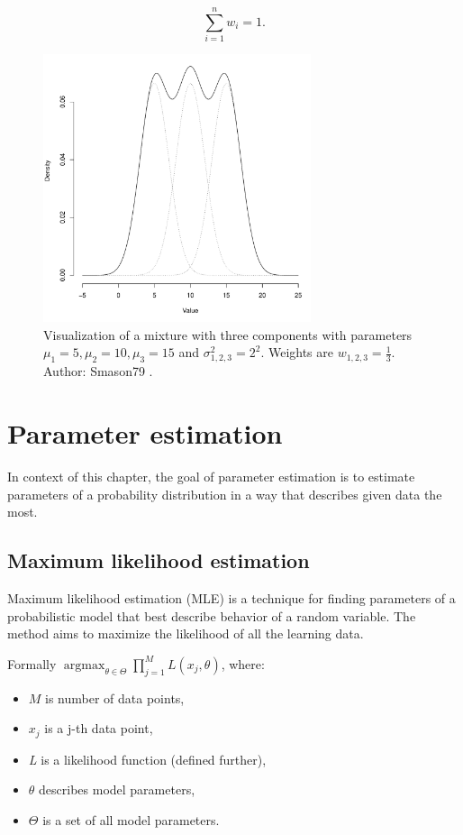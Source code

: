 \documentclass[thesis=B,english]{FITthesis}[2012/06/26]
\DeclareMathOperator*{\argmax}{argmax} %
\begin{document}
\begin{equation}
\sum_{i=1}^n w_i = 1.
\end{equation}

\begin{figure}
	\centering
 	\includegraphics[width=0.7\textwidth]{gaussian_mixture}
 	\caption{Visualization of a mixture with three components with parameters $\mu_1=5, \mu_2=10, \mu_3=15$ and $\sigma_{1,2,3}^2=2^2$. Weights are $w_{1,2,3} = \frac{1}{3}$. Author: Smason79 \cite{gaussian-mixture}.}
 	\label{fig:gaussian_mixture}
\end{figure}

\chapter{Parameter estimation}
\label{parameter-estimation-chapter}
In context of this chapter, the goal of parameter estimation is to estimate parameters of a probability distribution in a way that describes given data the most.

\section{Maximum likelihood estimation}
Maximum likelihood estimation (MLE) is a technique for finding parameters of a probabilistic model that best describe behavior of a random variable. The method aims to maximize the likelihood of all the learning data.

Formally $\argmax_{\theta \in \Theta} \prod_{j=1}^{M} L(x_j, \theta)$, where:

\begin{itemize}

\item $M$ is number of data points,
\item $x_j$ is a j-th data point,
\item \emph{L} is a likelihood function (defined further),
\item $\theta$ describes model parameters,
\item $\Theta$ is a set of all model parameters.

\end{itemize}
\end{document}
